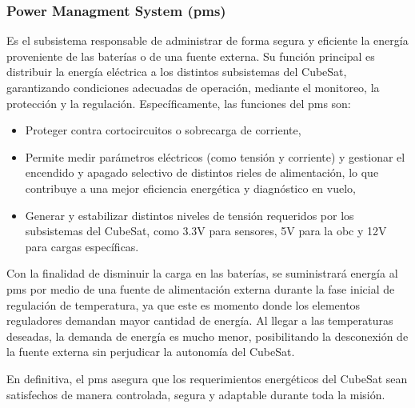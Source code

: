   \subsubsection{Power Managment System (\acrshort{pms})}
    Es el subsistema responsable de administrar de forma segura y eficiente la energía
    proveniente de las baterías o de una fuente externa. Su función principal es distribuir la energía eléctrica a
    los distintos subsistemas del CubeSat, garantizando condiciones adecuadas de operación, mediante el monitoreo,
    la protección y la regulación.  Específicamente, las funciones del \acrshort{pms} son:
    \begin{itemize}
      \item Proteger contra cortocircuitos o sobrecarga de corriente,
      \item Permite medir parámetros eléctricos (como
        tensión y corriente) y gestionar el encendido y apagado selectivo de distintos rieles de alimentación, lo que
        contribuye a una mejor eficiencia energética y diagnóstico en vuelo, 
      \item Generar y estabilizar distintos niveles
          de tensión requeridos por los subsistemas del CubeSat, como 3.3V para sensores, 5V para la \acrshort{obc}
           y 12V para cargas específicas.
    \end{itemize}

    Con la finalidad de disminuir la carga en las baterías, se suministrará energía al \acrshort{pms} por medio de
    una fuente de alimentación externa durante la fase inicial de regulación de temperatura, ya que este es momento
    donde los elementos reguladores demandan mayor cantidad de energía.  Al llegar a las temperaturas deseadas,
    la demanda de energía es mucho menor, posibilitando la desconexión de la fuente externa sin perjudicar la
    autonomía del CubeSat.

    En definitiva, el \acrshort{pms} asegura que los requerimientos energéticos del CubeSat sean satisfechos de
    manera controlada, segura y adaptable durante toda la misión.


